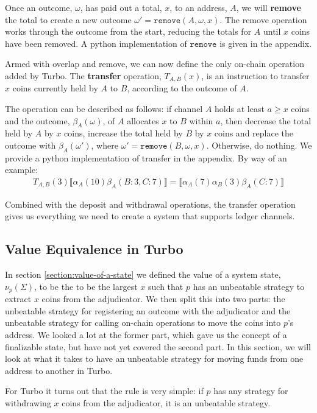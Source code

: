 \documentclass{article}
\theoremstyle{definition}
\newcommand{\adj}[1]{\llbracket #1 \rrbracket}
\begin{document}
Once an outcome, $\omega$, has paid out a total, $x$, to an address, $A$, we will \textbf{remove} the total to create a new outcome $\omega' = \texttt{remove}(A, \omega, x)$.
The remove operation works through the outcome from the start, reducing the totals for $A$ until $x$ coins have been removed.
A python implementation of $\texttt{remove}$ is given in the appendix.

Armed with overlap and remove, we can now define the only on-chain operation added by Turbo.
The \textbf{transfer} operation, $T_{A,B}(x)$, is an instruction to transfer $x$ coins
currently held by $A$ to $B$, according to the outcome of $A$.

The operation can be described as follows:
if channel $A$ holds at least $a \geq x$ coins
and the outcome, $\beta_A(\omega)$, of $A$ allocates $x$ to $B$ within $a$,
then decrease the total held by $A$ by $x$ coins,
increase the total held by $B$ by $x$ coins
and replace the outcome with $\beta_A(\omega')$, where $\omega' = \texttt{remove}(B, \omega, x)$.
Otherwise, do nothing.
We provide a python implementation of transfer in the appendix.
By way of an example:
\begin{align*}
T_{A,B}(3) \adj{\alpha_A(10)\beta_A(B: 3, C: 7)} = \adj{\alpha_A(7)\alpha_B(3)\beta_A(C: 7)}
\end{align*}

Combined with the deposit and withdrawal operations, the transfer operation gives us everything we need to create a system that supports ledger channels.

\subsection{Value Equivalence in Turbo}

In section \ref{section:value-of-a-state} we defined the value of a system state, $\nu_p(\Sigma)$, to be the to be the largest $x$ such that $p$ has an unbeatable strategy to extract $x$ coins from the adjudicator.
We then split this into two parts: the unbeatable strategy for registering an outcome with the adjudicator and the unbeatable strategy for calling on-chain operations to move the coins into $p$'s address.
We looked a lot at the former part, which gave us the concept of a finalizable state,
but have not yet covered the second part.
In this section, we will look at what it takes to have an unbeatable strategy for moving funds from one address to another in Turbo.

For Turbo it turns out that the rule is very simple: if $p$ has any strategy for withdrawing $x$ coins from the adjudicator, it is an unbeatable strategy.
\end{document}
